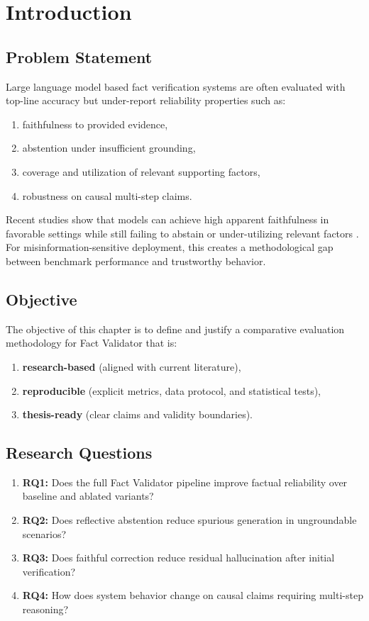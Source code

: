 \documentclass[12pt,a4paper,oneside]{report}
\begin{document}
\tableofcontents
\listoftables
\clearpage
{}

\chapter{Introduction}
\label{chap:intro}

\section{Problem Statement}
Large language model based fact verification systems are often evaluated with top-line accuracy but under-report reliability properties such as:
\begin{enumerate}
  \item faithfulness to provided evidence,
  \item abstention under insufficient grounding,
  \item coverage and utilization of relevant supporting factors,
  \item robustness on causal multi-step claims.
\end{enumerate}

Recent studies show that models can achieve high apparent faithfulness in favorable settings while still failing to abstain or under-utilizing relevant factors \citep{zhang2025faithfulness,zhang2025reflective}.
For misinformation-sensitive deployment, this creates a methodological gap between benchmark performance and trustworthy behavior.

\section{Objective}
The objective of this chapter is to define and justify a comparative evaluation methodology for Fact Validator that is:
\begin{enumerate}
  \item \textbf{research-based} (aligned with current literature),
  \item \textbf{reproducible} (explicit metrics, data protocol, and statistical tests),
  \item \textbf{thesis-ready} (clear claims and validity boundaries).
\end{enumerate}

\section{Research Questions}
\begin{enumerate}
  \item \textbf{RQ1:} Does the full Fact Validator pipeline improve factual reliability over baseline and ablated variants?
  \item \textbf{RQ2:} Does reflective abstention reduce spurious generation in ungroundable scenarios?
  \item \textbf{RQ3:} Does faithful correction reduce residual hallucination after initial verification?
  \item \textbf{RQ4:} How does system behavior change on causal claims requiring multi-step reasoning?
\end{enumerate}
\end{document}
